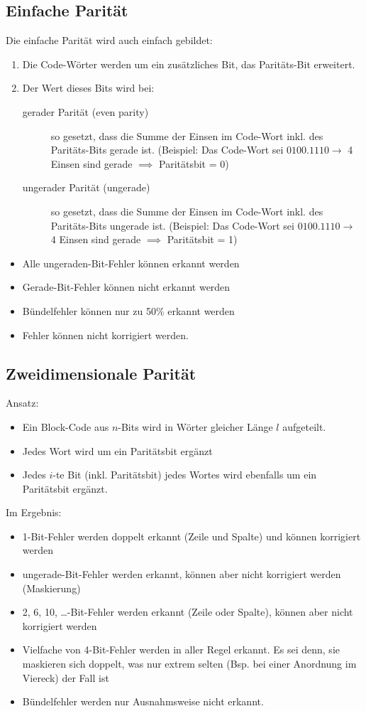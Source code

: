 \subsection{Einfache Parität}
Die einfache Parität wird auch einfach gebildet:
\begin{enumerate}
	\item Die Code-Wörter werden um ein zusätzliches Bit, das Paritäts-Bit erweitert.
	\item Der Wert dieses Bits wird bei:
		\begin{description}
			\item [gerader Parität (even parity)] so gesetzt, dass die Summe der Einsen im Code-Wort inkl. des Paritäts-Bits gerade ist.
			(Beispiel: Das Code-Wort sei $0100.1110 \rightarrow $ 4 Einsen sind gerade $\implies$ Paritätsbit = 0) 
			\item [ungerader Parität (ungerade)] so gesetzt, dass die Summe der Einsen im Code-Wort inkl. des Paritäts-Bits ungerade ist.
			(Beispiel: Das Code-Wort sei $0100.1110 \rightarrow $ 4 Einsen sind gerade $\implies$ Paritätsbit = 1) 
		\end{description}
\end{enumerate}

\begin{itemize}
	\item Alle ungeraden-Bit-Fehler können erkannt werden
	\item Gerade-Bit-Fehler können nicht erkannt werden
	\item Bündelfehler können nur zu 50\% erkannt werden
	\item Fehler können nicht korrigiert werden.
\end{itemize}

\subsection{Zweidimensionale Parität}
Ansatz:
\begin{itemize}
	\item Ein Block-Code aus $n$-Bits wird in Wörter gleicher Länge $l$ aufgeteilt.
	\item Jedes Wort wird um ein Paritätsbit ergänzt
	\item Jedes $i$-te Bit (inkl. Paritätsbit) jedes Wortes wird ebenfalls um ein Paritätsbit ergänzt.
\end{itemize}

Im Ergebnis:
\begin{itemize}
	\item 1-Bit-Fehler werden doppelt erkannt (Zeile und Spalte) und können korrigiert werden
	\item ungerade-Bit-Fehler werden erkannt, können aber nicht korrigiert werden (Maskierung)
	\item 2, 6, 10, \dots-Bit-Fehler werden erkannt (Zeile oder Spalte), können aber nicht korrigiert werden
	\item Vielfache von 4-Bit-Fehler werden in aller Regel erkannt. Es sei denn, sie maskieren sich doppelt, was nur extrem selten 
	(Bsp. bei einer Anordnung im Viereck) der Fall ist
	\item Bündelfehler werden nur Ausnahmsweise nicht erkannt.
\end{itemize}

